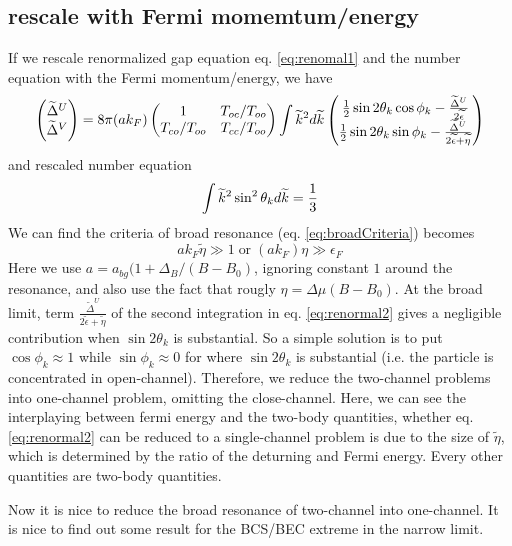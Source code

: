 \subsection{rescale with Fermi momemtum/energy}
If we rescale renormalized gap equation eq. \ref{eq:renomal1} and the number equation with the Fermi momentum/energy, we have 
\begin{equation}\label{eq:renormal2}
\begin{pmatrix}\widetilde\Delta^U\\\widetilde\Delta^V\end{pmatrix}=
8\pi({a}{k_F})\begin{pmatrix}1&T_{oc}/T_{oo}\\T_{co}/T_{oo}&T_{cc}/T_{oo}\end{pmatrix}
\int\widetilde{k}^2d\widetilde{k}
\begin{pmatrix}
\frac{1}{2}\sin2\theta_{k}\cos\phi_k-\frac{\widetilde\Delta^U}{2\widetilde\epsilon}\\
\frac{1}{2}\sin2\theta_{k}\sin\phi_k-\frac{\widetilde\Delta^U}{2\widetilde\epsilon+\widetilde{\eta}}
\end{pmatrix}
\end{equation}
and rescaled number equation
\begin{equation}
 \int\widetilde{k}^2\sin^2\theta_kd\widetilde{k}=\frac{1}{3}
\end{equation}
We can find the criteria of broad resonance (eq. \ref{eq:broadCriteria}) becomes 
\begin{equation}
 ak_F\widetilde{\eta}\gg1 \;\text{or}\; (ak_F)\eta\gg\epsilon_F
\end{equation}
Here we use $a=a_{bg}(1+\Delta_B/(B-B_0)$,  ignoring constant $1$ around the resonance, and also use the fact that rougly $\eta=\Delta\mu(B-B_0)$. At the broad limit, term $\frac{\widetilde\Delta^U}{2\widetilde\epsilon+\widetilde{\eta}}$ of the second integration in eq. \ref{eq:renormal2} gives a negligible contribution when $\sin2\theta_k$ is substantial.  So a simple solution is to put $\cos\phi_k\approx1$ while $\sin\phi_k\approx0$ for where $\sin2\theta_k$ is substantial (i.e. the particle is concentrated in open-channel).  Therefore, we reduce the two-channel problems into one-channel problem, omitting the close-channel. Here, we can see the interplaying between fermi energy and the two-body quantities, whether eq. \ref{eq:renormal2} can be reduced to a single-channel problem is due to the size of $\widetilde{\eta}$, which is determined by the ratio of the deturning and Fermi energy.  Every other quantities are two-body quantities. 

Now it is nice to reduce the broad resonance of two-channel into one-channel.  It is nice to find out some result for the BCS/BEC extreme in the narrow limit. 